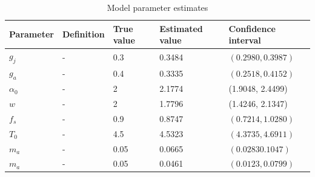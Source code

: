 \documentclass[12pt, table]{article}
\begin{document}
\begin{table}[H]
\small
\begin{center}
\begin{tabular}{lllll}
  \hline
  Parameter&Definition&True value&Estimated value& Confidence interval\\
  \hline
  $g_j$&-&0.3&0.3484&$(0.2980, 0.3987)$\\
  $g_a$&-&0.4&0.3335&$(0.2518, 0.4152)$\\
  $\alpha_0$&-&2&2.1774&(1.9048, 2.4499)\\
  $w$&-&2&1.7796&(1.4246, 2.1347)\\
  $f_s$&-&0.9&0.8747&$(0.7214,  1.0280)$\\
  $T_0$&-&4.5&4.5323&$(4.3735, 4.6911)$\\
  $m_a$&-&0.05&0.0665&$(0.0283   0.1047)$\\
  $m_a$&-&0.05&0.0461&$(0.0123,   0.0799)$\\
  \hline
\end{tabular}
\end{center}
\caption{Model parameter estimates}
\label{table1}
\end{table}
\end{document}
